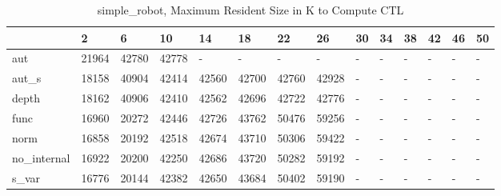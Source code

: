 \begin{table}
\caption{simple_robot, Maximum Resident Size in K to Compute CTL}
\label{simple_robot_CTL_size}
\begin{tabular}{llllllllllllll}
\toprule
 & 2 & 6 & 10 & 14 & 18 & 22 & 26 & 30 & 34 & 38 & 42 & 46 & 50 \\
\midrule
aut & 21964 & 42780 & 42778 & - & - & - & - & - & - & - & - & - & - \\
aut_s & 18158 & 40904 & 42414 & 42560 & 42700 & 42760 & 42928 & - & - & - & - & - & - \\
depth & 18162 & 40906 & 42410 & 42562 & 42696 & 42722 & 42776 & - & - & - & - & - & - \\
func & 16960 & 20272 & 42446 & 42726 & 43762 & 50476 & 59256 & - & - & - & - & - & - \\
norm & 16858 & 20192 & 42518 & 42674 & 43710 & 50306 & 59422 & - & - & - & - & - & - \\
no_internal & 16922 & 20200 & 42250 & 42686 & 43720 & 50282 & 59192 & - & - & - & - & - & - \\
s_var & 16776 & 20144 & 42382 & 42650 & 43684 & 50402 & 59190 & - & - & - & - & - & - \\
\bottomrule
\end{tabular}
\end{table}
